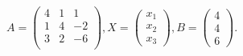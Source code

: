 \documentclass[12pt]{article}
\begin{document}
$ \begin{equation*}A=\begin{pmatrix}4 & 1 & 1 \\1 & 4 & -2 \\3 & 2 & -6 \\\end{pmatrix}, X=\begin{pmatrix}x_1 \\x_2 \\x_3\end{pmatrix}, B = \begin{pmatrix}4 \\4 \\6\end{pmatrix}.\end{equation*} $
\end{document}
